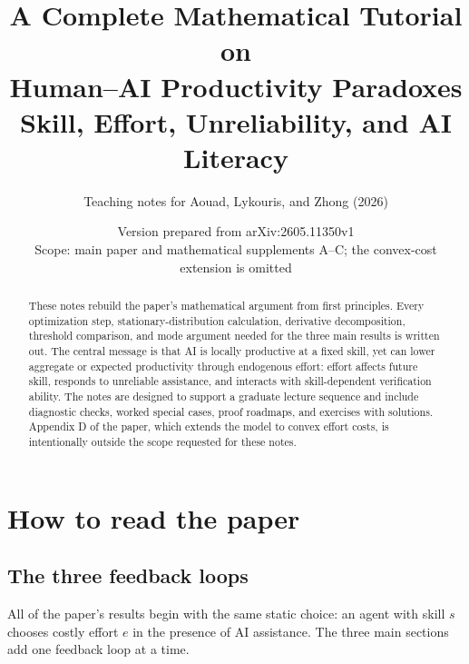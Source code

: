 \documentclass[11pt]{article}
\title{\vspace{-1.2cm}\textbf{A Complete Mathematical Tutorial on\\Human--AI Productivity Paradoxes}\\[5pt]
\large Skill, Effort, Unreliability, and AI Literacy}
\author{Teaching notes for Aouad, Lykouris, and Zhong (2026)}
\date{Version prepared from arXiv:2605.11350v1\\[2pt]
\small Scope: main paper and mathematical supplements A--C; the convex-cost extension is omitted}
\theoremstyle{tutorial}
\theoremstyle{remark}
\newcommand{\1}{\mathbb{I}}
\begin{document}
\maketitle

\begin{abstract}
These notes rebuild the paper's mathematical argument from first principles.  Every optimization step,
stationary-distribution calculation, derivative decomposition, threshold comparison, and mode argument
needed for the three main results is written out.  The central message is that AI is locally productive
at a fixed skill, yet can lower aggregate or expected productivity through endogenous effort: effort affects
future skill, responds to unreliable assistance, and interacts with skill-dependent verification ability.
The notes are designed to support a graduate lecture sequence and include diagnostic checks, worked special
cases, proof roadmaps, and exercises with solutions.  Appendix D of the paper, which extends the model to
convex effort costs, is intentionally outside the scope requested for these notes.
\end{abstract}

\tableofcontents
\newpage

\section{How to read the paper}

\subsection{The three feedback loops}

All of the paper's results begin with the same static choice: an agent with skill $s$ chooses costly effort
$e$ in the presence of AI assistance.  The three main sections add one feedback loop at a time.

\begin{center}
\end{center}
\end{document}
